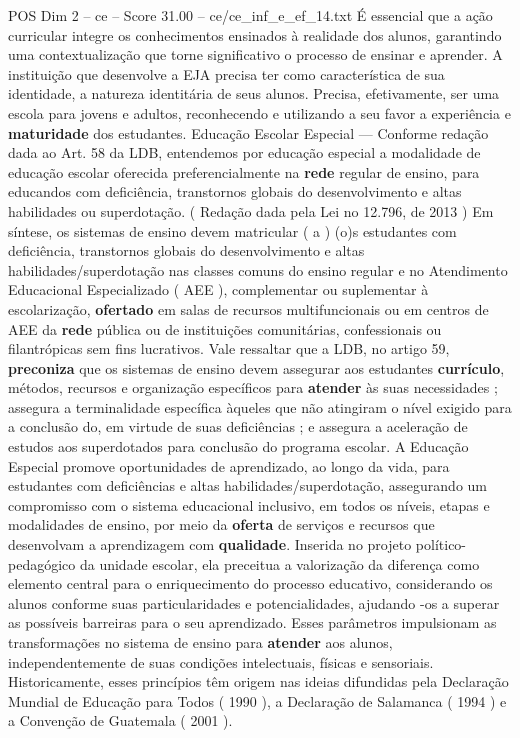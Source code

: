 \begin{textsample}{POS Dim 2 – ce – Score 31.00 – ce/ce\_inf\_e\_ef\_14.txt}
É essencial que a ação curricular integre os conhecimentos ensinados à realidade dos alunos, garantindo uma contextualização que torne significativo o processo de ensinar e aprender.
A instituição que desenvolve a EJA precisa ter como característica de sua identidade, a natureza identitária de seus alunos.
Precisa, efetivamente, ser uma escola para jovens e adultos, reconhecendo e utilizando a seu favor a experiência e \textbf{maturidade} dos estudantes.
Educação Escolar Especial — Conforme redação dada ao Art. 58 da LDB, entendemos por educação especial a modalidade de educação escolar oferecida preferencialmente na \textbf{rede} regular de ensino, para educandos com deficiência, transtornos globais do desenvolvimento e altas habilidades ou superdotação. ( Redação dada pela Lei no 12.796, de 2013 ) Em síntese, os sistemas de ensino devem matricular ( a ) (o)s estudantes com deficiência, transtornos globais do desenvolvimento e altas habilidades/superdotação nas classes comuns do ensino regular e no Atendimento Educacional Especializado ( AEE ), complementar ou suplementar à escolarização, \textbf{ofertado} em salas de recursos multifuncionais ou em centros de AEE da \textbf{rede} pública ou de instituições comunitárias, confessionais ou filantrópicas sem fins lucrativos.
Vale ressaltar que a LDB, no artigo 59, \textbf{preconiza} que os sistemas de ensino devem assegurar aos estudantes \textbf{currículo}, métodos, recursos e organização específicos para \textbf{atender} às suas necessidades ; assegura a terminalidade específica àqueles que não atingiram o nível exigido para a conclusão do, em virtude de suas deficiências ; e assegura a aceleração de estudos aos superdotados para conclusão do programa escolar.
A Educação Especial promove oportunidades de aprendizado, ao longo da vida, para estudantes com deficiências e altas habilidades/superdotação, assegurando um compromisso com o sistema educacional inclusivo, em todos os níveis, etapas e modalidades de ensino, por meio da \textbf{oferta} de serviços e recursos que desenvolvam a aprendizagem com \textbf{qualidade}.
Inserida no projeto político-pedagógico da unidade escolar, ela preceitua a valorização da diferença como elemento central para o enriquecimento do processo educativo, considerando os alunos conforme suas particularidades e potencialidades, ajudando -os a superar as possíveis barreiras para o seu aprendizado.
Esses parâmetros impulsionam as transformações no sistema de ensino para \textbf{atender} aos alunos, independentemente de suas condições intelectuais, físicas e sensoriais.
Historicamente, esses princípios têm origem nas ideias difundidas pela Declaração Mundial de Educação para Todos ( 1990 ), a Declaração de Salamanca ( 1994 ) e a Convenção de Guatemala ( 2001 ).

\end{textsample}
